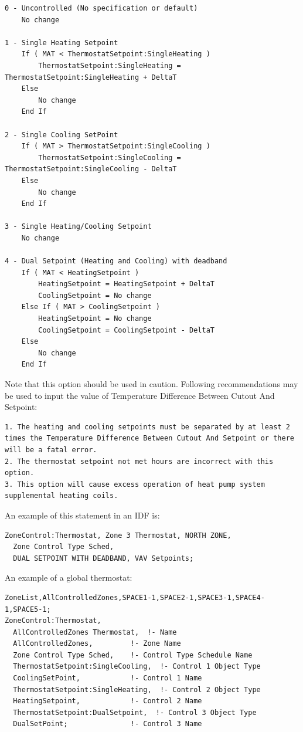 \begin{lstlisting}
0 - Uncontrolled (No specification or default)
	No change

1 - Single Heating Setpoint
	If ( MAT < ThermostatSetpoint:SingleHeating )
		ThermostatSetpoint:SingleHeating = ThermostatSetpoint:SingleHeating + DeltaT
	Else
		No change
	End If

2 - Single Cooling SetPoint
	If ( MAT > ThermostatSetpoint:SingleCooling )
		ThermostatSetpoint:SingleCooling = ThermostatSetpoint:SingleCooling - DeltaT
	Else
		No change
	End If

3 - Single Heating/Cooling Setpoint
	No change

4 - Dual Setpoint (Heating and Cooling) with deadband
	If ( MAT < HeatingSetpoint )
		HeatingSetpoint = HeatingSetpoint + DeltaT
		CoolingSetpoint = No change
	Else If ( MAT > CoolingSetpoint )
		HeatingSetpoint = No change
		CoolingSetpoint = CoolingSetpoint - DeltaT
	Else
		No change
	End If
\end{lstlisting}

Note that this option should be used in caution. Following recommendations may be used to input the value of Temperature Difference Between Cutout And Setpoint:

\begin{lstlisting}
1. The heating and cooling setpoints must be separated by at least 2 times the Temperature Difference Between Cutout And Setpoint or there will be a fatal error.
2. The thermostat setpoint not met hours are incorrect with this option.
3. This option will cause excess operation of heat pump system supplemental heating coils.

\end{lstlisting}

An example of this statement in an IDF is:

\begin{lstlisting}
ZoneControl:Thermostat, Zone 3 Thermostat, NORTH ZONE,
  Zone Control Type Sched,
  DUAL SETPOINT WITH DEADBAND, VAV Setpoints;
\end{lstlisting}

An example of a global thermostat:

\begin{lstlisting}
ZoneList,AllControlledZones,SPACE1-1,SPACE2-1,SPACE3-1,SPACE4-1,SPACE5-1;
ZoneControl:Thermostat,
  AllControlledZones Thermostat,  !- Name
  AllControlledZones,         !- Zone Name
  Zone Control Type Sched,    !- Control Type Schedule Name
  ThermostatSetpoint:SingleCooling,  !- Control 1 Object Type
  CoolingSetPoint,            !- Control 1 Name
  ThermostatSetpoint:SingleHeating,  !- Control 2 Object Type
  HeatingSetpoint,            !- Control 2 Name
  ThermostatSetpoint:DualSetpoint,  !- Control 3 Object Type
  DualSetPoint;               !- Control 3 Name
\end{lstlisting}


